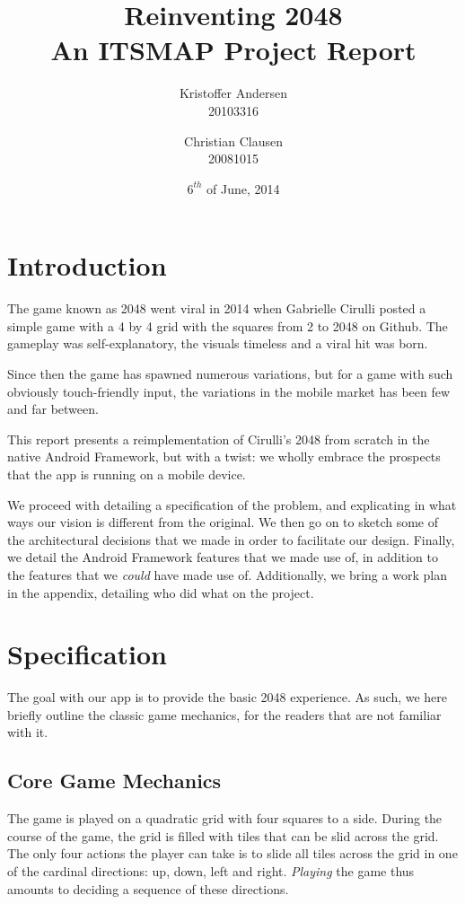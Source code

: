 \documentclass[a4paper, 12pt]{article}
\title{Reinventing 2048 \\ \large{An ITSMAP Project Report}}
\author{Kristoffer Andersen \\ \large{20103316} \and
Christian Clausen \\ \large{20081015}}
\date{$6^{th}$ of June, 2014}
\begin{document}
\maketitle
\newpage
\tableofcontents
\newpage
{}

\section{Introduction}
The game known as 2048 went viral in 2014 when Gabrielle Cirulli
posted a simple game with a 4 by 4 grid with the squares from 2 to
2048 on Github. The gameplay was self-explanatory, the visuals
timeless and a viral hit was born.

Since then the game has spawned numerous variations, but for a game
with such obviously touch-friendly input, the variations in the mobile
market has been few and far between.

This report presents a reimplementation of Cirulli's 2048 from scratch
in the native Android Framework, but with a twist: we wholly embrace
the prospects that the app is running on a mobile device.

We proceed with detailing a specification of the problem, and
explicating in what ways our vision is different from the original. We
then go on to sketch some of the architectural decisions that we made
in order to facilitate our design. Finally, we detail the Android
Framework features that we made use of, in addition to the features
that we \emph{could} have made use of. Additionally, we bring a work
plan in the appendix, detailing who did what on the project.

\section{Specification}
The goal with our app is to provide the basic 2048 experience. As
such, we here briefly outline the classic game mechanics, for the
readers that are not familiar with it.

\subsection{Core Game Mechanics}

The game is played on a quadratic grid with four squares to a
side. During the course of the game, the grid is filled with tiles
that can be slid across the grid. The only four actions the player can
take is to slide all tiles across the grid in one of the cardinal
directions: up, down, left and right. \emph{Playing} the game thus
amounts to deciding a sequence of these directions.
\end{document}
